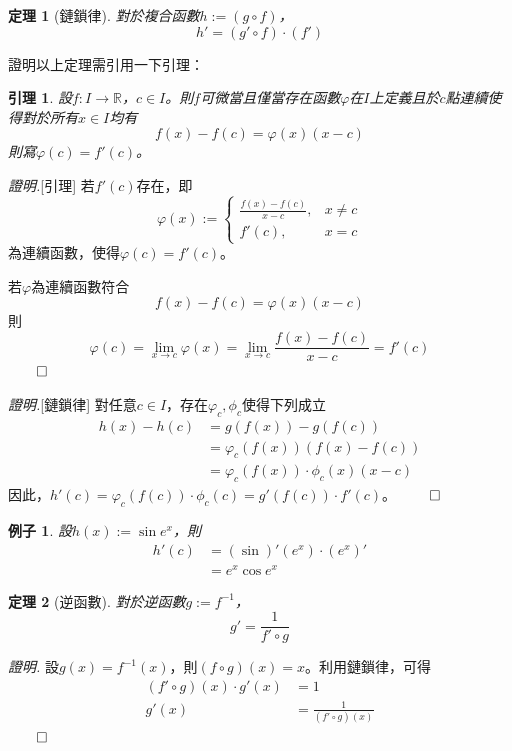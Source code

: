 \documentclass[12pt]{article}
\newtheorem*{theorem}{定理}
\newtheorem*{lemma}{引理}
\newtheorem*{example}{例子}
\renewenvironment*{proof}{\textit{證明.}}{\hfill$\qed$}
\begin{document}
    \begin{theorem}[鏈鎖律]
        對於複合函數$h:=(g\circ f)$，$$h'=(g'\circ f)\cdot(f')$$
    \end{theorem}

    證明以上定理需引用一下引理：

    \begin{lemma}
        設$f:I\to\mathbb{R}$，$c\in I$。則$f$可微當且僅當存在函數$\varphi$在$I$上定義且於$c$點連續使得對於所有$x\in I$均有$$f(x)-f(c)=\varphi(x)(x-c)$$則寫$\varphi(c)=f'(c)$。
    \end{lemma}

    \begin{proof}[引理]
        若$f'(c)$存在，即$$\varphi(x):=\begin{cases}
            \frac{f(x)-f(c)}{x-c}, & x\neq c\\
            f'(c), & x=c
        \end{cases}$$為連續函數，使得$\varphi(c)=f'(c)$。

        若$\varphi$為連續函數符合$$f(x)-f(c)=\varphi(x)(x-c)$$則$$\varphi(c)=\lim_{x\to c}\varphi(x)=\lim_{x\to c}\frac{f(x)-f(c)}{x-c}=f'(c)$$
    \end{proof}

    \begin{proof}[鏈鎖律]
        對任意$c\in I$，存在$\varphi_c,\phi_c$使得下列成立
        \begin{align*}
            h(x)-h(c)&=g(f(x))-g(f(c))\\
            &=\varphi_c(f(x))(f(x)-f(c))\\
            &=\varphi_c(f(x))\cdot \phi_c(x)(x-c)
        \end{align*}
        因此，$h'(c)=\varphi_c(f(c))\cdot \phi_c(c)=g'(f(c))\cdot f'(c)$。
    \end{proof}

    \begin{example}
        設$h(x):=\sin{e^x}$，則\begin{align*}
            h'(c)&=(\sin)'(e^x)\cdot (e^x)'\\
            &=e^x\cos{e^x}
        \end{align*}
    \end{example}

    \begin{theorem}[逆函數]
        對於逆函數$g:=f^{-1}$，$$g'=\frac{1}{f'\circ g}$$
    \end{theorem}

    \begin{proof}
        設$g(x)=f^{-1}(x)$，則$(f\circ g)(x)=x$。利用鏈鎖律，可得\begin{align*}
            (f'\circ g)(x)\cdot g'(x)&=1\\
            g'(x)&=\frac{1}{(f'\circ g)(x)}
        \end{align*}
    \end{proof}
\end{document}
